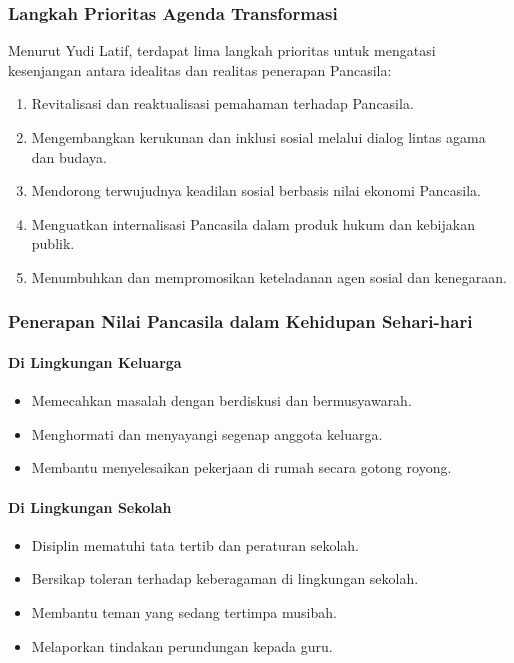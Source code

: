 \subsubsection{Langkah Prioritas Agenda Transformasi}
Menurut Yudi Latif, terdapat lima langkah prioritas untuk mengatasi kesenjangan antara idealitas dan realitas penerapan Pancasila:
\begin{enumerate}
\item Revitalisasi dan reaktualisasi pemahaman terhadap Pancasila.
\item Mengembangkan kerukunan dan inklusi sosial melalui dialog lintas agama dan budaya.
\item Mendorong terwujudnya keadilan sosial berbasis nilai ekonomi Pancasila.
\item Menguatkan internalisasi Pancasila dalam produk hukum dan kebijakan publik.
\item Menumbuhkan dan mempromosikan keteladanan agen sosial dan kenegaraan.
\end{enumerate}

\subsubsection{Penerapan Nilai Pancasila dalam Kehidupan Sehari-hari}
\paragraph{Di Lingkungan Keluarga}
\begin{itemize}
\item Memecahkan masalah dengan berdiskusi dan bermusyawarah.
\item Menghormati dan menyayangi segenap anggota keluarga.
\item Membantu menyelesaikan pekerjaan di rumah secara gotong royong.
\end{itemize}

\paragraph{Di Lingkungan Sekolah}
\begin{itemize}
\item Disiplin mematuhi tata tertib dan peraturan sekolah.
\item Bersikap toleran terhadap keberagaman di lingkungan sekolah.
\item Membantu teman yang sedang tertimpa musibah.
\item Melaporkan tindakan perundungan kepada guru.
\end{itemize}
